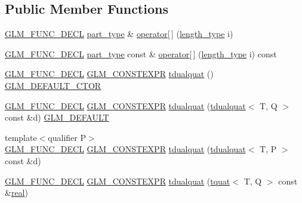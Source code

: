 \subsection*{Public Member Functions}
\begin{DoxyCompactItemize}
\item 
\hyperlink{setup_8hpp_ab2d052de21a70539923e9bcbf6e83a51}{G\+L\+M\+\_\+\+F\+U\+N\+C\+\_\+\+D\+E\+CL} \hyperlink{structglm_1_1tdualquat_ab18b8665bbd568f9bc93ef93ed475a47}{part\+\_\+type} \& \hyperlink{structglm_1_1tdualquat_a23ea50ee4bf311b8d37155ebec56dd90}{operator\mbox{[}$\,$\mbox{]}} (\hyperlink{structglm_1_1tdualquat_ad9fa4fd7f84d17bebd3efed6b5455d80}{length\+\_\+type} i)
\item 
\hyperlink{setup_8hpp_ab2d052de21a70539923e9bcbf6e83a51}{G\+L\+M\+\_\+\+F\+U\+N\+C\+\_\+\+D\+E\+CL} \hyperlink{structglm_1_1tdualquat_ab18b8665bbd568f9bc93ef93ed475a47}{part\+\_\+type} const  \& \hyperlink{structglm_1_1tdualquat_a8a6db73181f9b7cba58d95704734f8e4}{operator\mbox{[}$\,$\mbox{]}} (\hyperlink{structglm_1_1tdualquat_ad9fa4fd7f84d17bebd3efed6b5455d80}{length\+\_\+type} i) const
\item 
\hyperlink{setup_8hpp_ab2d052de21a70539923e9bcbf6e83a51}{G\+L\+M\+\_\+\+F\+U\+N\+C\+\_\+\+D\+E\+CL} \hyperlink{setup_8hpp_a08b807947b47031d3a511f03f89645ad}{G\+L\+M\+\_\+\+C\+O\+N\+S\+T\+E\+X\+PR} \hyperlink{structglm_1_1tdualquat_ab2b5e57b73a6f79c56e9bcdc7d5e1607}{tdualquat} () \hyperlink{setup_8hpp_afb97a4e995bc004c0cbbfa22125b80ba}{G\+L\+M\+\_\+\+D\+E\+F\+A\+U\+L\+T\+\_\+\+C\+T\+OR}
\item 
\hyperlink{setup_8hpp_ab2d052de21a70539923e9bcbf6e83a51}{G\+L\+M\+\_\+\+F\+U\+N\+C\+\_\+\+D\+E\+CL} \hyperlink{setup_8hpp_a08b807947b47031d3a511f03f89645ad}{G\+L\+M\+\_\+\+C\+O\+N\+S\+T\+E\+X\+PR} \hyperlink{structglm_1_1tdualquat_ad6099c663113c443a9efeeabbd321bd1}{tdualquat} (\hyperlink{structglm_1_1tdualquat}{tdualquat}$<$ T, Q $>$ const \&d) \hyperlink{setup_8hpp_aefce7051c376a64ba89fa93a9f63bc2c}{G\+L\+M\+\_\+\+D\+E\+F\+A\+U\+LT}
\item 
{\footnotesize template$<$qualifier P$>$ }\\\hyperlink{setup_8hpp_ab2d052de21a70539923e9bcbf6e83a51}{G\+L\+M\+\_\+\+F\+U\+N\+C\+\_\+\+D\+E\+CL} \hyperlink{setup_8hpp_a08b807947b47031d3a511f03f89645ad}{G\+L\+M\+\_\+\+C\+O\+N\+S\+T\+E\+X\+PR} \hyperlink{structglm_1_1tdualquat_a23b9100d907a648204929a4c3392a56a}{tdualquat} (\hyperlink{structglm_1_1tdualquat}{tdualquat}$<$ T, P $>$ const \&d)
\item 
\hyperlink{setup_8hpp_ab2d052de21a70539923e9bcbf6e83a51}{G\+L\+M\+\_\+\+F\+U\+N\+C\+\_\+\+D\+E\+CL} \hyperlink{setup_8hpp_a08b807947b47031d3a511f03f89645ad}{G\+L\+M\+\_\+\+C\+O\+N\+S\+T\+E\+X\+PR} \hyperlink{structglm_1_1tdualquat_aca6bbe930bd0b26c217b535fe06df688}{tdualquat} (\hyperlink{structglm_1_1tquat}{tquat}$<$ T, Q $>$ const \&\hyperlink{structglm_1_1tdualquat_a25909f92feb14a77756d2e83f9ec0b20}{real})

\end{DoxyCompactItemize}
